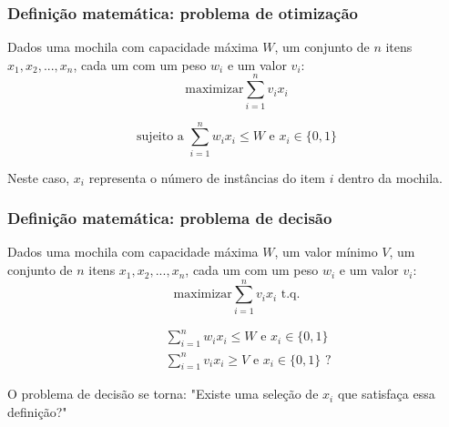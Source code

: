 \documentclass{beamer}
\begin{document}
\begin{frame}
\frametitle{Definição matemática: problema de otimização}

    Dados uma mochila com capacidade máxima $W$, um conjunto de $n$ itens $x_{1}, x_{2}, ..., x_{n}$,
    cada um com um peso $w_{i}$ e um valor $v_{i}$:\\

    \begin{equation*}
        \text{maximizar} \sum_{i=1}^{n} v_{i} x_{i}
    \end{equation*}

    \begin{equation*}
        \mbox{sujeito a } \sum_{i=1}^{n} w_{i} x_{i} \leq W \mbox{ e } x_{i} \in \{0,1\}
    \end{equation*}

    Neste caso, $x_{i}$ representa o número de instâncias do item $i$ dentro da mochila.

\end{frame}

\begin{frame}
    \frametitle{Definição matemática: problema de decisão}

    Dados uma mochila com capacidade máxima $W$, um valor mínimo $V$, um conjunto de $n$ itens $x_{1}, x_{2}, ..., x_{n}$,
    cada um com um peso $w_{i}$ e um valor $v_{i}$:\\

    \begin{equation*}
        \text{maximizar} \sum_{i=1}^{n} v_{i} x_{i} \text{ t.q.}
    \end{equation*}

    \begin{equation*}
        \begin{split}
            &\quad \sum_{i=1}^{n} w_{i} x_{i} \leq W \mbox{ e } x_{i} \in \{0,1\} \\
            &\quad \sum_{i=1}^{n} v_{i} x_{i} \geq V \mbox{ e } x_{i} \in \{0,1\} \text{ ?}
        \end{split}
    \end{equation*}

    O problema de decisão se torna: "Existe uma seleção de $x_{i}$ que satisfaça essa definição?"

\end{frame}
\end{document}
